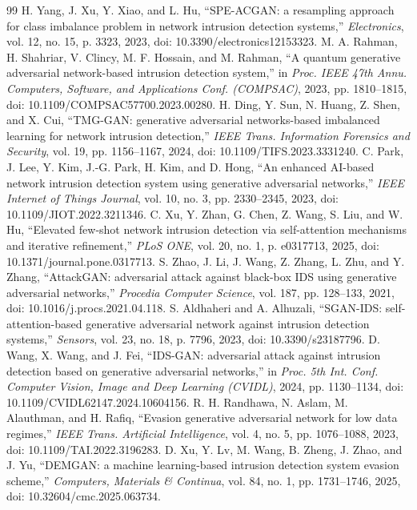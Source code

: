 \documentclass{iaesarticle}
\begin{document}
\begin{thebibliography}{99}
 H. Yang, J. Xu, Y. Xiao, and L. Hu, ``SPE-ACGAN: a resampling approach for class imbalance problem in network intrusion detection systems,'' \textsl{Electronics}, vol. 12, no. 15, p. 3323, 2023, doi: 10.3390/electronics12153323.
 M. A. Rahman, H. Shahriar, V. Clincy, M. F. Hossain, and M. Rahman, ``A quantum generative adversarial network-based intrusion detection system,'' in \textsl{Proc. IEEE 47th Annu. Computers, Software, and Applications Conf. (COMPSAC)}, 2023, pp. 1810--1815, doi: 10.1109/COMPSAC57700.2023.00280.
 H. Ding, Y. Sun, N. Huang, Z. Shen, and X. Cui, ``TMG-GAN: generative adversarial networks-based imbalanced learning for network intrusion detection,'' \textsl{IEEE Trans. Information Forensics and Security}, vol. 19, pp. 1156--1167, 2024, doi: 10.1109/TIFS.2023.3331240.
 C. Park, J. Lee, Y. Kim, J.-G. Park, H. Kim, and D. Hong, ``An enhanced AI-based network intrusion detection system using generative adversarial networks,'' \textsl{IEEE Internet of Things Journal}, vol. 10, no. 3, pp. 2330--2345, 2023, doi: 10.1109/JIOT.2022.3211346.
 C. Xu, Y. Zhan, G. Chen, Z. Wang, S. Liu, and W. Hu, ``Elevated few-shot network intrusion detection via self-attention mechanisms and iterative refinement,'' \textsl{PLoS ONE}, vol. 20, no. 1, p. e0317713, 2025, doi: 10.1371/journal.pone.0317713.
 S. Zhao, J. Li, J. Wang, Z. Zhang, L. Zhu, and Y. Zhang, ``AttackGAN: adversarial attack against black-box IDS using generative adversarial networks,'' \textsl{Procedia Computer Science}, vol. 187, pp. 128--133, 2021, doi: 10.1016/j.procs.2021.04.118.
 S. Aldhaheri and A. Alhuzali, ``SGAN-IDS: self-attention-based generative adversarial network against intrusion detection systems,'' \textsl{Sensors}, vol. 23, no. 18, p. 7796, 2023, doi: 10.3390/s23187796.
 D. Wang, X. Wang, and J. Fei, ``IDS-GAN: adversarial attack against intrusion detection based on generative adversarial networks,'' in \textsl{Proc. 5th Int. Conf. Computer Vision, Image and Deep Learning (CVIDL)}, 2024, pp. 1130--1134, doi: 10.1109/CVIDL62147.2024.10604156.
 R. H. Randhawa, N. Aslam, M. Alauthman, and H. Rafiq, ``Evasion generative adversarial network for low data regimes,'' \textsl{IEEE Trans. Artificial Intelligence}, vol. 4, no. 5, pp. 1076--1088, 2023, doi: 10.1109/TAI.2022.3196283.
 D. Xu, Y. Lv, M. Wang, B. Zheng, J. Zhao, and J. Yu, ``DEMGAN: a machine learning-based intrusion detection system evasion scheme,'' \textsl{Computers, Materials \& Continua}, vol. 84, no. 1, pp. 1731--1746, 2025, doi: 10.32604/cmc.2025.063734.

\end{thebibliography}
\end{document}
